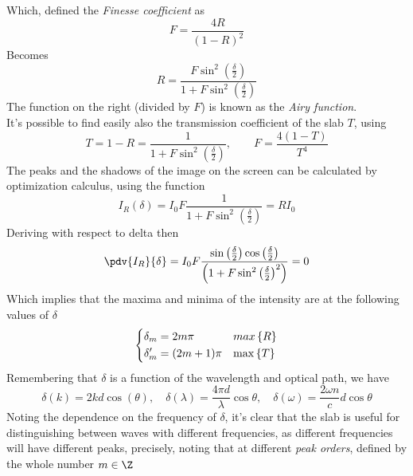 \documentclass[../electromagnetism.tex]{subfiles}
\begin{document}
Which, defined the \textit{Finesse coefficient} as
\begin{equation}
	F=\frac{4R}{(1-R)^2}
	\label{eq:finesse.mbi}
\end{equation}
Becomes
\begin{equation}
	R=\frac{F\sin^2\left( \frac{\delta}{2} \right)}{1+F\sin^2\left( \frac{\delta}{2} \right)}
	\label{eq:refcoefffinesse.mbi}
\end{equation}
The function on the right (divided by $F$) is known as the \textit{Airy function}.\\
It's possible to find easily also the transmission coefficient of the slab $T$, using
\begin{equation}
	T=1-R=\frac{1}{1+F\sin^2\left( \frac{\delta}{2} \right)}, \qquad F=\frac{4(1-T)}{T^4}
	\label{eq:transcoefffinesse.mbi}
\end{equation}
The peaks and the shadows of the image on the screen can be calculated by optimization calculus, using the function
\begin{equation*}
	I_R(\delta)=I_0F\frac{1}{1+F\sin^2\left( \frac{\delta}{2} \right)}=RI_0
\end{equation*}
Deriving with respect to delta then
\begin{equation*}
	\pdv{I_R}{\delta}=I_0F\frac{\sin\left( \frac{\delta}{2} \right)\cos\left( \frac{\delta}{2} \right)}{\left( 1+F\sin^2\left( \frac{\delta}{2} \right)^2 \right)}=0
\end{equation*}
Which implies that the maxima and minima of the intensity are at the following values of $\delta$
\begin{equation}
	\begin{dcases}
		\delta_m=2m\pi&max\left\{ R \right\}\\
		\delta_m'=(2m+1)\pi&\max\left\{ T \right\}
	\end{dcases}
	\label{eq:maximaminimaI.mbi}
\end{equation}
Remembering that $\delta$ is a function of the wavelength and optical path, we have
\begin{equation*}
	\delta(k)=2kd\cos(\theta), \quad\delta(\lambda)=\frac{4\pi d}{\lambda}\cos\theta, \quad\delta(\omega)=\frac{2\omega n}{c}d\cos\theta
\end{equation*}
Noting the dependence on the frequency of $\delta$, it's clear that the slab is useful for distinguishing between waves with different frequencies, as different frequencies will have different peaks, precisely, noting that at different \textit{peak orders}, defined by the whole number $m\in\Z$
\end{document}
